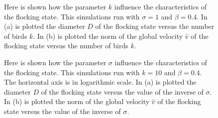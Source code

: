 \documentclass{article} %
\begin{document}
\newpage
\begin{figure}[ht]
    \centering
    \caption{Here is shown how the parameter $k$ influence the characteristics of the flocking state.
        This simulations run with $\sigma=1$ and $\beta=0.4$.
        In (a) is plotted the diameter $D$ of the flocking state versus the number of birds $k$.
        In (b) is plotted the norm of the global velocity $\widehat{v}$ of the flocking state 
        versus the number of birds $k$.}
    \label{fig2}
\end{figure}
\begin{figure}[ht]
    \centering
    \caption{Here is shown how the parameter $\sigma$ influence the characteristics of the flocking state.
    This simulations run with $k=10$ and $\beta=0.4$. The horizontal axis is in logarithmic scale.
    In (a) is plotted the diameter $D$ of the flocking state versus the value of the inverse of $\sigma$.
    In (b) is plotted the norm of the global velocity $\widehat{v}$ of the flocking state 
    versus the value of the inverse of $\sigma$.}
    \label{fig3}
\end{figure}
\end{document}
